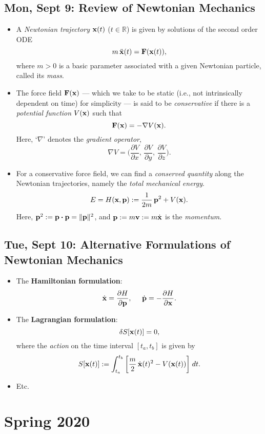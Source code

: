 \documentclass[10pt, oneside]{article}
\newcommand{\R}{\mathbb{R}}
\newcommand{\Cdot}{\boldsymbol{\cdot}}
\begin{document}
\subsection{Mon, Sept 9: Review of Newtonian Mechanics}

\begin{itemize}

\item  A {\em Newtonian trajectory} ${\bf x}(t)$ ($t \in \R$) is given by solutions of the second order ODE
\[ m\, \ddot{{\bf x}}(t) = {\bf F}({\bf x}(t)), \]
where $m > 0$ is a basic parameter associated with a given Newtonian particle, called its {\em mass}.

\item The force field ${\bf F}({\bf x})$ --- which we take to be static (i.e., not intrinsically dependent on time) for simplicity --- is said to be {\em conservative} if there is a {\em potential function} $V({\bf x})$ such that
\[ {\bf F}({\bf x}) = -\nabla V({\bf x}). \]
Here, `$\nabla$' denotes the {\em gradient operator}, 
\[ \nabla V = \bigg( \frac{\partial V}{\partial x}, \, \frac{\partial V}{\partial y}, \, \frac{\partial V}{\partial z} \bigg). \]

\item For a conservative force field, we can find a {\em conserved quantity} along the Newtonian trajectories, namely the {\em total mechanical energy}.
\[ E = H({\bf x}, {\bf p}) := \frac{1}{2m}\, {\bf p}^2 + V({\bf x}). \]
Here, ${\bf p}^2 := {\bf p} \Cdot {\bf p} = \| {\bf p} \|^2$, and ${\bf p} := m {\bf v} := m \dot{{\bf x}}$ is the {\em momentum}.

\end{itemize}

\subsection{Tue, Sept 10: Alternative Formulations of Newtonian Mechanics}

\begin{itemize}

\item The {\bf Hamiltonian formulation}:
\[ \dot{{\bf x}} = \frac{\partial H}{\partial {\bf p}}, \;\;\;\;\; \dot{{\bf p}} = - \frac{\partial H}{\partial {\bf x}}. \]

\item The {\bf Lagrangian formulation}:
\[ \delta S[{\bf x}(t)] = 0, \]
where the {\em action} on the time interval $[t_a, t_b]$ is given by
\[ S[{\bf x}(t)] := \int_{t_a}^{t_b} \bigg[ \frac{m}{2} \, \dot{{\bf x}}(t)^2 - V({\bf x}(t)) \bigg]  \; dt. \]

\item Etc.

\end{itemize}


\section{Spring 2020}
\end{document}
